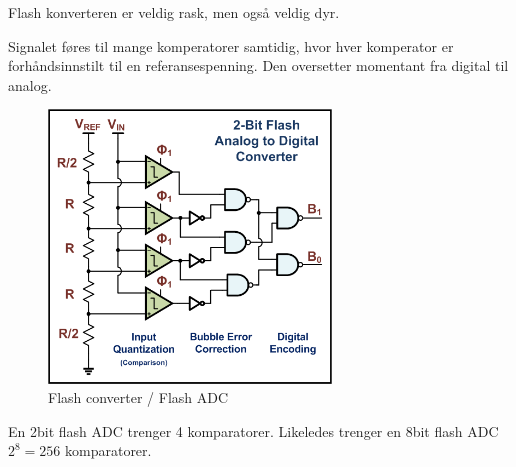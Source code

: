 Flash konverteren er veldig rask, men også veldig dyr.

Signalet føres til mange komperatorer samtidig, hvor hver komperator er
forhåndsinnstilt til en referansespenning.
Den oversetter momentant fra digital til analog.

\begin{figure}[H]
  \centering
  \caption{Flash converter / Flash ADC}
  \includegraphics[width=0.67\textwidth]{./img/flashadc}
\end{figure}

En 2bit flash ADC trenger 4 komparatorer.
Likeledes trenger en 8bit flash ADC $2^8 = 256$ komparatorer.
